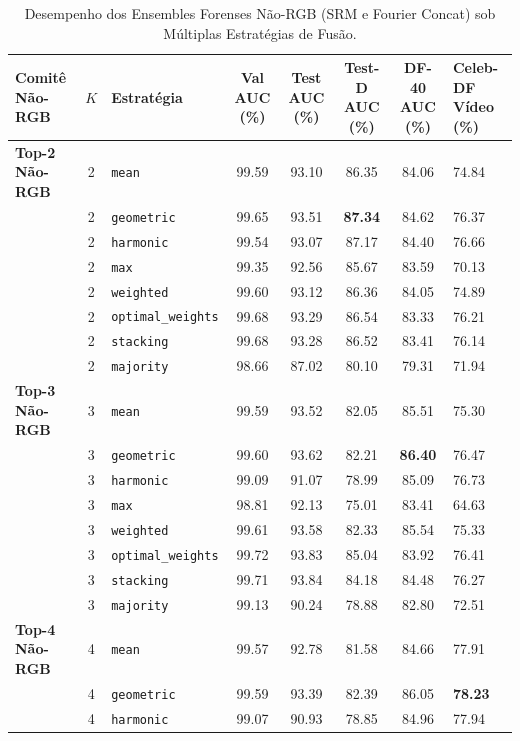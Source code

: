 \begin{table}[t]
\centering
\small
\caption{Desempenho dos Ensembles Forenses Não-RGB (SRM e Fourier Concat) sob Múltiplas Estratégias de Fusão.}
\label{tab:non_rgb_ensembles}
\begin{tabular}{l c l c c c c}
\toprule
\textbf{Comitê Não-RGB} & \textbf{$K$} & \textbf{Estratégia} & \textbf{Val AUC (\%)} & \textbf{Test AUC (\%)} & \textbf{Test-D AUC (\%)} & \textbf{DF-40 AUC (\%)} & \textbf{Celeb-DF Vídeo (\%)} \\
\midrule
\textbf{Top-2 Não-RGB} & 2 & \texttt{mean} & 99.59 & 93.10 & 86.35 & 84.06 & 74.84 \\
 & 2 & \texttt{geometric} & 99.65 & 93.51 & \textbf{87.34} & 84.62 & 76.37 \\
 & 2 & \texttt{harmonic} & 99.54 & 93.07 & 87.17 & 84.40 & 76.66 \\
 & 2 & \texttt{max} & 99.35 & 92.56 & 85.67 & 83.59 & 70.13 \\
 & 2 & \texttt{weighted} & 99.60 & 93.12 & 86.36 & 84.05 & 74.89 \\
 & 2 & \texttt{optimal_weights} & 99.68 & 93.29 & 86.54 & 83.33 & 76.21 \\
 & 2 & \texttt{stacking} & 99.68 & 93.28 & 86.52 & 83.41 & 76.14 \\
 & 2 & \texttt{majority} & 98.66 & 87.02 & 80.10 & 79.31 & 71.94 \\
\midrule
\textbf{Top-3 Não-RGB} & 3 & \texttt{mean} & 99.59 & 93.52 & 82.05 & 85.51 & 75.30 \\
 & 3 & \texttt{geometric} & 99.60 & 93.62 & 82.21 & \textbf{86.40} & 76.47 \\
 & 3 & \texttt{harmonic} & 99.09 & 91.07 & 78.99 & 85.09 & 76.73 \\
 & 3 & \texttt{max} & 98.81 & 92.13 & 75.01 & 83.41 & 64.63 \\
 & 3 & \texttt{weighted} & 99.61 & 93.58 & 82.33 & 85.54 & 75.33 \\
 & 3 & \texttt{optimal_weights} & 99.72 & 93.83 & 85.04 & 83.92 & 76.41 \\
 & 3 & \texttt{stacking} & 99.71 & 93.84 & 84.18 & 84.48 & 76.27 \\
 & 3 & \texttt{majority} & 99.13 & 90.24 & 78.88 & 82.80 & 72.51 \\
\midrule
\textbf{Top-4 Não-RGB} & 4 & \texttt{mean} & 99.57 & 92.78 & 81.58 & 84.66 & 77.91 \\
 & 4 & \texttt{geometric} & 99.59 & 93.39 & 82.39 & 86.05 & \textbf{78.23} \\
 & 4 & \texttt{harmonic} & 99.07 & 90.93 & 78.85 & 84.96 & 77.94 \\

\end{tabular}
\end{table}
